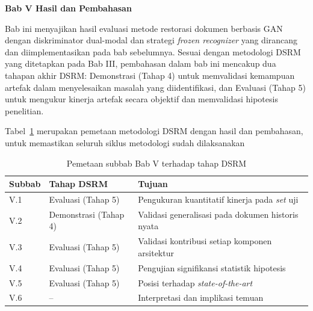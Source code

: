 


\vspace{2cm}
\begin{center}
    {\fontsize{14}{16.8}\selectfont\textbf{Bab V \quad Hasil dan Pembahasan}}
\end{center}
\label{sec:hasil-dan-pembahasan}
\setcounter{section}{5}
\setcounter{subsection}{0}
\setcounter{table}{0}
\setcounter{figure}{0}

Bab ini menyajikan hasil evaluasi metode restorasi dokumen berbasis GAN dengan diskriminator dual-modal dan strategi \textit{frozen recognizer} yang dirancang dan diimplementasikan pada bab sebelumnya. Sesuai dengan metodologi DSRM yang ditetapkan pada Bab III, pembahasan dalam bab ini mencakup dua tahapan akhir DSRM: Demonstrasi (Tahap 4) untuk memvalidasi kemampuan artefak dalam menyelesaikan masalah yang diidentifikasi, dan Evaluasi (Tahap 5) untuk mengukur kinerja artefak secara objektif dan memvalidasi hipotesis penelitian.

Tabel~\ref{tab:dsrm-mapping} merupakan pemetaan metodologi DSRM dengan hasil dan pembahasan, untuk memastikan seluruh siklus metodologi sudah dilaksanakan

\begin{table}[!htbp]
    \caption[Pemetaan subbab ke tahap DSRM]{Pemetaan subbab Bab V terhadap tahap DSRM}
    \label{tab:dsrm-mapping}
    \small
    \begin{tabularx}{\textwidth}{|>{\raggedright\arraybackslash}l|>{\raggedright\arraybackslash}l|>{\raggedright\arraybackslash}X|}
        \hline
        \textbf{Subbab} & \textbf{Tahap DSRM} & \textbf{Tujuan} \\
        \hline
        V.1 & Evaluasi (Tahap 5) & Pengukuran kuantitatif kinerja pada \textit{set} uji \\
        V.2 & Demonstrasi (Tahap 4) & Validasi generalisasi pada dokumen historis nyata \\
        V.3 & Evaluasi (Tahap 5) & Validasi kontribusi setiap komponen arsitektur \\
        V.4 & Evaluasi (Tahap 5) & Pengujian signifikansi statistik hipotesis \\
        V.5 & Evaluasi (Tahap 5) & Posisi terhadap \textit{state-of-the-art} \\
        V.6 & -- & Interpretasi dan implikasi temuan \\
        \hline
    \end{tabularx}
\end{table}

